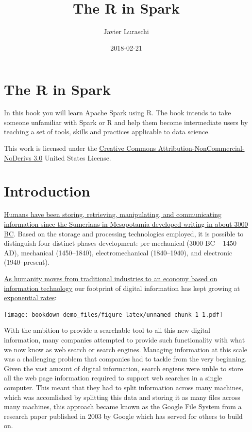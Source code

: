 \documentclass[]{book}
\title{The R in Spark}
\author{Javier Luraschi}
\date{2018-02-21}
\theoremstyle{definition}
\theoremstyle{definition}
\theoremstyle{definition}
\theoremstyle{remark}
\begin{document}
\maketitle

{
\setcounter{tocdepth}{1}
\tableofcontents
}
\chapter*{The R in Spark}\label{the-r-in-spark}

In this book you will learn Apache Spark using R. The book intends to
take someone unfamiliar with Spark or R and help them become
intermediate users by teaching a set of tools, skills and practices
applicable to data science.

This work is licensed under the
\href{http://creativecommons.org/licenses/by-nc-nd/3.0/us/}{Creative
Commons Attribution-NonCommercial-NoDerivs 3.0} United States License.

\chapter{Introduction}\label{intro}

\href{https://en.wikipedia.org/wiki/Information_technology}{Humans have
been storing, retrieving, manipulating, and communicating information
since the Sumerians in Mesopotamia developed writing in about 3000 BC}.
Based on the storage and processing technologies employed, it is
possible to distinguish four distinct phases development: pre-mechanical
(3000 BC -- 1450 AD), mechanical (1450--1840), electromechanical
(1840--1940), and electronic (1940--present).

\href{https://en.wikipedia.org/wiki/Information_Age}{As humanity moves
from traditional industries to an economy based on information
technology} our footprint of digital information has kept growing at
\href{http://documents.worldbank.org/curated/en/896971468194972881/310436360_201602630200201/additional/102725-PUB-Replacement-PUBLIC.pdf}{exponential
rates}:

\texttt{[image: bookdown-demo\_files/figure-latex/unnamed-chunk-1-1.pdf]}

With the ambition to provide a searchable tool to all this new digital
information, many companies attempted to provide such functionality with
what we now know as web search or search engines. Managing information
at this scale was a challenging problem that companies had to tackle
from the very beginning. Given the vast amount of digital information,
search engiens were unble to store all the web page information required
to support web searches in a single computer. This meant that they had
to split information across many machines, which was accomlished by
splitting this data and storing it as many files across many machines,
this approach became known as the Google File System from a research
paper published in 2003 by Google which has served for others to build
on.
\end{document}
